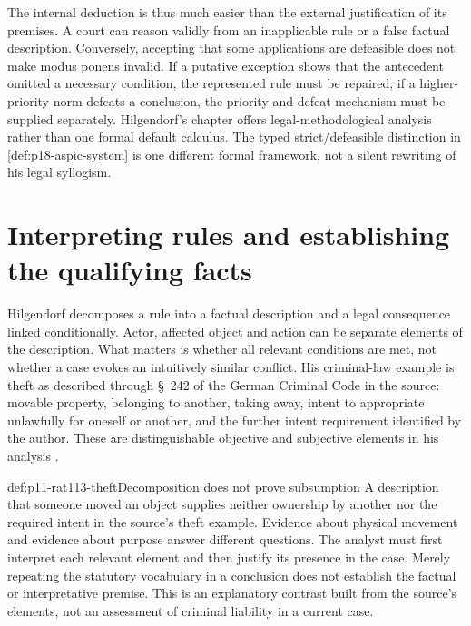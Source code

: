 The internal deduction is thus much easier than the external justification
of its premises. A court can reason validly from an inapplicable rule or a
false factual description. Conversely, accepting that some applications
are defeasible does not make modus ponens invalid. If a putative exception
shows that the antecedent omitted a necessary condition, the represented
rule must be repaired; if a higher-priority norm defeats a conclusion, the
priority and defeat mechanism must be supplied separately. Hilgendorf's
chapter offers legal-methodological analysis rather than one formal default
calculus. The typed strict/defeasible distinction in
\cref{def:p18-aspic-system} is one different formal framework, not a
silent rewriting of his legal syllogism.

\section{Interpreting rules and establishing the qualifying facts}
\label{sec:p11-rat113-interpretation}

Hilgendorf decomposes a rule into a factual description and a legal
consequence linked conditionally. Actor, affected object and action can be
separate elements of the description. What matters is whether all relevant
conditions are met, not whether a case evokes an intuitively similar
conflict. His criminal-law example is theft as described through
\S~242 of the German Criminal Code in the source: movable property,
belonging to another, taking away, intent to appropriate unlawfully for
oneself or another, and the further intent requirement identified by the
author. These are distinguishable objective and subjective elements in his
analysis \parencite[pp.~660, 662]{Hilgendorf2021LegalLogic}.

\begin{hbexample}{def:p11-rat113-theft}{Decomposition does not prove subsumption}
A description that someone moved an object supplies neither ownership by
another nor the required intent in the source's theft example. Evidence
about physical movement and evidence about purpose answer different
questions. The analyst must first interpret each relevant element and then
justify its presence in the case. Merely repeating the statutory vocabulary
in a conclusion does not establish the factual or interpretative premise.
This is an explanatory contrast built from the source's elements, not an
assessment of criminal liability in a current case.
\end{hbexample}

